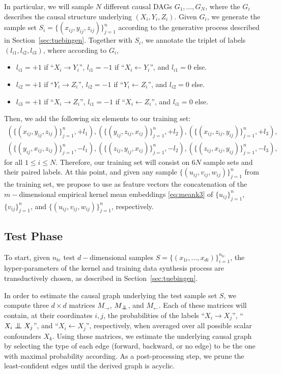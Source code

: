 \documentclass{article}
\newcommand{\indep}{\mathrel{\text{\scalebox{1.07}{$\perp\mkern-10mu\perp$}}}}
\begin{document}
In particular, we will sample $N$ different causal DAGs $G_1, \ldots, G_N$,
where the $G_i$ describes the causal structure underlying $(X_i, Y_i, Z_i)$.
Given $G_i$, we generate the sample set $S_i = \{(x_{ij}, y_{ij}, z_{ij})\}_{j=1}^n$
according to the generative process described in Section~\ref{sec:tuebingen}.
Together with $S_i$, we annotate the triplet of labels $(l_{i1}, l_{i2}, l_{i3})$, where according to $G_i$,
\begin{itemize}
  \item $l_{i1} = +1$ if ``$X_i \to Y_i$'', $l_{i1} = -1$ if ``$X_i \leftarrow Y_i$'', and $l_{i1} = 0$ else.
  \item $l_{i2} = +1$ if ``$Y_i \to Z_i$'', $l_{i2} = -1$ if ``$Y_i \leftarrow Z_i$'', and $l_{i2} = 0$ else.
  \item $l_{i3} = +1$ if ``$X_i \to Z_i$'', $l_{i1} = -1$ if ``$X_i \leftarrow Z_i$'', and $l_{i1} = 0$ else.
\end{itemize}
Then, we add the following six elements to our training set:
\begin{align*}
(\{(x_{ij},y_{ij}, z_{ij})\}_{j=1}^n,+l_1), (\{(y_{ij},z_{ij}, x_{ij})\}_{j=1}^n,+l_2), (\{(x_{ij},z_{ij}, y_{ij})\}_{j=1}^n,+l_3),\\
(\{(y_{ij},x_{ij}, z_{ij})\}_{j=1}^n,-l_1), (\{(z_{ij},y_{ij}, x_{ij})\}_{j=1}^n,-l_2), (\{(z_{ij},x_{ij}, y_{ij})\}_{j=1}^n,-l_3),
\end{align*}
for all $1 \leq i \leq N$.  Therefore, our training set will consist on $6N$ sample sets and their paired labels. At this point, and given any sample $\{(u_{ij},
  v_{ij}, w_{ij})\}_{j=1}^n$ from the training set, we propose to use as
  feature vectors the concatenation of the $m-$dimensional empirical kernel
  mean embeddings \eqref{eq:meank3} of $\{u_{ij}\}_{j=1}^n$,
  $\{v_{ij}\}_{j=1}^n$, and $\{(u_{ij}, v_{ij}, w_{ij})\}_{j=1}^n$,
  respectively. 

\subsection{Test Phase}
To start, given $n_{te}$ test $d-$dimensional samples $S = \{(x_{1i}, \ldots,
x_{di})\}_{i=1}^{n_{te}}$, the hyper-parameters of the kernel and training data
synthesis process are transductively chosen, as described in
Section~\ref{sec:tuebingen}.

In order to estimate the causal graph underlying the test sample set $S$, we compute
three $d \times d$ matrices $M_\to$, $M_{\indep}$, and $M_{\leftarrow}$. Each of these
matrices will contain, at their coordinates $i,j$, the
probabilities of the labels ``$X_i \to X_j$'', ``$X_i \indep X_j$'', and ``$X_i
\leftarrow X_j$'', respectively, when averaged over all possible scalar confounders
$X_k$.  Using these matrices, we estimate the underlying causal graph by
selecting the type of each edge (forward, backward, or no edge) to be the one with
maximal probability according. As a post-processing step, we prune the least-confident
edges until the derived graph is acyclic. 
\end{document}
